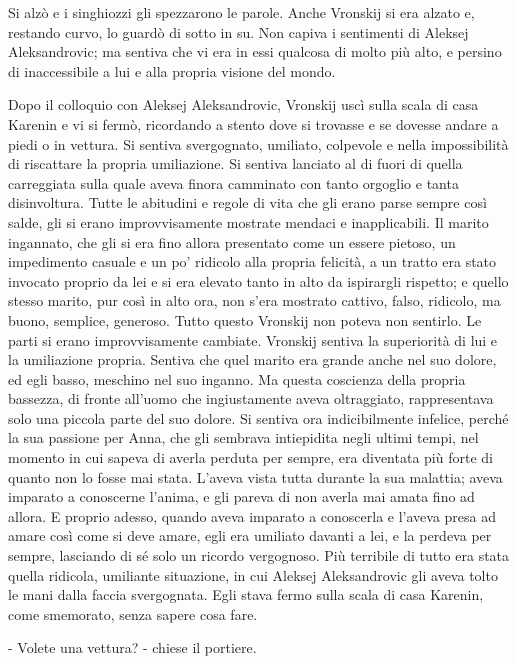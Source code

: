 Si alzò e i singhiozzi gli spezzarono le parole. Anche Vronskij si era alzato e, restando curvo, lo guardò di sotto in su. Non capiva i sentimenti di Aleksej Aleksandrovic; ma sentiva che vi era in essi qualcosa di molto più alto, e persino di inaccessibile a lui e alla propria visione del mondo. 

\label{xviii-3} 

Dopo il colloquio con Aleksej Aleksandrovic, Vronskij uscì sulla scala di casa Karenin e vi si fermò, ricordando a stento dove si trovasse e se dovesse andare a piedi o in vettura. Si sentiva svergognato, umiliato, colpevole e nella impossibilità di riscattare la propria umiliazione. Si sentiva lanciato al di fuori di quella carreggiata sulla quale aveva finora camminato con tanto orgoglio e tanta disinvoltura. Tutte le abitudini e regole di vita che gli erano parse sempre così salde, gli si erano improvvisamente mostrate mendaci e inapplicabili. Il marito ingannato, che gli si era fino allora presentato come un essere pietoso, un impedimento casuale e un po' ridicolo alla propria felicità, a un tratto era stato invocato proprio da lei e si era elevato tanto in alto da ispirargli rispetto; e quello stesso marito, pur così in alto ora, non s'era mostrato cattivo, falso, ridicolo, ma buono, semplice, generoso. Tutto questo Vronskij non poteva non sentirlo. Le parti si erano improvvisamente cambiate. Vronskij sentiva la superiorità di lui e la umiliazione propria. Sentiva che quel marito era grande anche nel suo dolore, ed egli basso, meschino nel suo inganno. Ma questa coscienza della propria bassezza, di fronte all'uomo che ingiustamente aveva oltraggiato, rappresentava solo una piccola parte del suo dolore. Si sentiva ora indicibilmente infelice, perché la sua passione per Anna, che gli sembrava intiepidita negli ultimi tempi, nel momento in cui sapeva di averla perduta per sempre, era diventata più forte di quanto non lo fosse mai stata. L'aveva vista tutta durante la sua malattia; aveva imparato a conoscerne l'anima, e gli pareva di non averla mai amata fino ad allora. E proprio adesso, quando aveva imparato a conoscerla e l'aveva presa ad amare così come si deve amare, egli era umiliato davanti a lei, e la perdeva per sempre, lasciando di sé solo un ricordo vergognoso. Più terribile di tutto era stata quella ridicola, umiliante situazione, in cui Aleksej Aleksandrovic gli aveva tolto le mani dalla faccia svergognata. Egli stava fermo sulla scala di casa Karenin, come smemorato, senza sapere cosa fare. 

- Volete una vettura? - chiese il portiere. 

